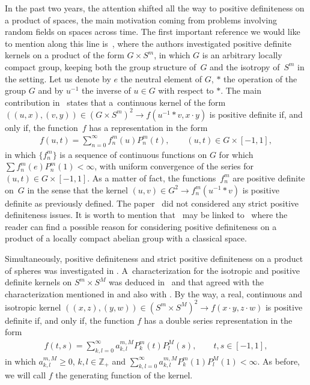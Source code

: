 \documentclass[pdftex]{sigma}
\numberwithin{equation}{section}
\begin{document}
In the past two years, the attention shifted all the way to positive def\/initeness on a product of spaces, the main motivation coming from problems involving random f\/ields on spaces across time. The f\/irst important reference we would like to mention along this line is~\cite{berg}, where the authors investigated positive def\/inite kernels on a product of the form $G\times S^m$, in which $G$ is an arbitrary locally compact group, keeping both the group structure of~$G$ and the isotropy of~$S^m$ in the setting. Let us denote by $e$ the neutral element of $G$, $*$ the operation of the group $G$ and by $u^{-1}$ the inverse of $u \in G$ with respect to $*$. The main contribution in~\cite{berg} states that a~continuous kernel of the form $((u,x), (v,y)) \in (G \times S^m)^2 \to f(u^{-1}*v, x\cdot y)$ is positive def\/inite if, and only if, the function~$f$ has a representation in the form
\begin{gather*}f(u,t)=\sum_{n=0}^{\infty}f_n^m(u) P_n^m(t), \qquad (u,t) \in G \times [-1,1],\end{gather*}
in which $\{f_n^m\}$ is a sequence of continuous functions on $G$ for which $\sum f_n^m(e)P_n^m(1)<\infty$, with uniform convergence of the series for $(u,t) \in G\times [-1,1]$. As a matter of fact, the functions~$f_n^m$ are positive def\/inite on~$G$ in the sense that the kernel $(u,v) \in G^2 \to f_n^m(u^{-1}*v)$ is positive def\/inite as previously def\/ined. The paper~\cite{berg} did not considered any strict positive def\/initeness issues. It is worth to mention that~\cite{berg} may be linked to~\cite{gneit} where the reader can f\/ind a possible reason for considering positive def\/initeness on a product of a locally compact abelian group with a classical space.

Simultaneously, positive def\/initeness and strict positive def\/initeness on a product of spheres was investigated in \cite{jean0,jean,jean1}. A~characterization for the isotropic and positive def\/inite kernels on $S^m \times S^M$ was deduced in~\cite{jean} and that agreed with the characterization mentioned in \cite{berg} and also with \cite[Chapter~4]{shapiro}. By the way, a real, continuous and isotropic kernel $((x,z), (y,w)) \in (S^m \times S^M)^2 \to f(x \cdot y, z \cdot w)$ is positive def\/inite if, and only if, the function $f$ has a double series representation in the form
\begin{gather}\label{requ}
f(t,s) = \sum_{k,l=0}^{\infty}a_{k,l}^{m,M}P_{k}^{m}(t)P_{l}^{M}(s), \qquad t,s \in [-1,1],
\end{gather}
in which $a_{k,l}^{m,M}\geq 0$, $k,l\in \mathbb{Z}_+$ and $\sum\limits_{k,l=0}^{\infty}a_{k,l}^{m,M}P_{k}^{m}(1)P_{l}^{M}(1)<\infty$. As before, we will call $f$ the generating function of the kernel.
\end{document}
